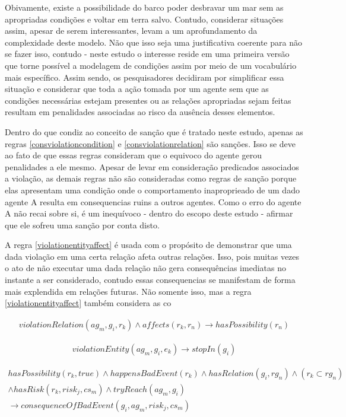 Obivamente, existe a possibilidade do barco poder desbravar 
um mar sem as apropriadas condições e voltar em terra salvo. Contudo, considerar situações assim, apesar de serem interessantes, levam a um aprofundamento 
da complexidade deste modelo. Não que isso seja uma justificativa coerente para não se fazer isso, contudo - neste estudo o interesse reside em uma 
primeira versão que torne possível a modelagem de condições assim por meio de um vocabulário mais específico. Assim sendo, os pesquisadores decidiram 
por simplificar essa situação e considerar que toda a ação tomada por um agente sem que as condições necessárias estejam presentes ou as relações apropriadas 
sejam feitas resultam em penalidades associadas ao risco da ausência desses elementos.  

Dentro do que condiz ao conceito de sanção que é tratado neste estudo, apenas as regras \ref{consviolationcondition} e \ref{consviolationrelation} são sanções. 
Isso se deve ao fato de que essas regras consideram que o equivoco do agente gerou penalidades a ele mesmo. Apesar de levar em consideração predicados associados 
a violação, as demais regras não são consideradas como regras de sanção porque elas apresentam uma condição onde o comportamento inaproprieado de um dado 
agente A resulta em consequencias ruins a outros agentes. Como o erro do agente A não recai sobre si, é um inequívoco - dentro do escopo deste estudo - afirmar 
que ele sofreu uma sanção por conta disto. 


A regra \ref{violationentityaffect} é usada com o propósito de demonstrar que uma dada violação em uma certa relação afeta outras relações. Isso, pois 
muitas vezes o ato de não executar uma dada relação não gera consequências imediatas no instante a ser considerado, contudo essas consequencias se 
manifestam de forma mais explendida em relações futuras. Não somente isso, mas a regra \ref{violationentityaffect} também considera as co

\begin{eqnarray}\label{violationentityaffect}
	violationRelation(ag_m,g_i,r_k) \wedge affects(r_k,r_n) \to hasPossibility(r_n)
\end{eqnarray}



\begin{eqnarray}\label{rel12}
	violationEntity(ag_m,g_i,e_k) \to stopIn(g_i)
\end{eqnarray}


\begin{eqnarray}\label{rel13}\nonumber
	hasPossibility(r_k,true) \wedge  happensBadEvent(r_k) \wedge hasRelation(g_i,rg_n) \wedge (r_k \subset rg_n) \nonumber \\ 
	\wedge hasRisk(r_k,risk_j,cs_m) \wedge tryReach(ag_m,g_i) \nonumber \\ 
	\to consequenceOfBadEvent(g_i,ag_m,risk_j,cs_m) \nonumber \\
\end{eqnarray}

